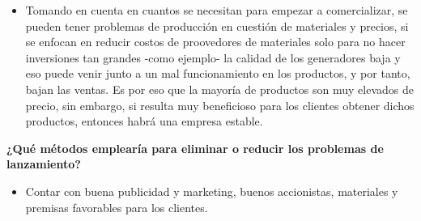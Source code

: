\documentclass[letterpaper,12pt]{article}
\begin{document}
\begin{sloppypar}
\begin{itemize}
    \item Tomando en cuenta en cuantos se necesitan para empezar a comercializar, se pueden tener problemas de producción en cuestión de materiales y precios, si se enfocan en reducir costos de proovedores de materiales solo para no hacer inversiones tan grandes -como ejemplo- la calidad de los generadores baja y eso puede venir junto a un mal funcionamiento en los productos, y por tanto, bajan las ventas. Es por eso que la mayoría de productos son muy elevados de precio, sin embargo, si resulta muy beneficioso para los clientes obtener dichos productos, entonces habrá una empresa estable.  
\end{itemize}
\textbf{¿Qué métodos emplearía para eliminar o reducir los problemas de lanzamiento? }
\begin{itemize}
    \item Contar con buena publicidad y marketing, buenos accionistas, materiales y premisas favorables para los clientes.
\end{itemize}

\end{sloppypar}
\end{document}
